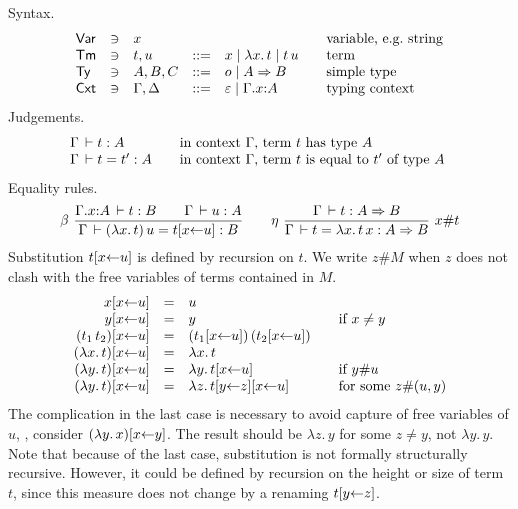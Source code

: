 \documentclass[a4paper,fleqn]{scrartcl}
\newcommand{\Var}{\mathsf{Var}}
\newcommand{\Ty}{\mathsf{Ty}}
\newcommand{\Tm}{\mathsf{Tm}}
\newcommand{\Cxt}{\mathsf{Cxt}}
\begin{document}
Syntax.
\[
\begin{array}{lllrl@{\qquad}l}
\Var & \ni & x & & & \mbox{variable, \eg string} \\
\Tm & \ni & t,u & ::= & x \mid \lambda x.\,t \mid t \, u & \mbox{term}
  \\
\Ty  & \ni & A,B,C & ::= & o \mid A \To B & \mbox{simple type} \\
\Cxt & \ni & \Gamma, \Delta & ::= & \varepsilon \mid \Gamma.x{:}A
  & \mbox{typing context}\\
\end{array}
\]
Judgements.
\[
\begin{array}{l@{\qquad}l}
  \Gamma \der t : A & \mbox{in context $\Gamma$, term $t$ has type $A$ } \\
  \Gamma \der t = t' : A & \mbox{in context $\Gamma$, term $t$ is equal to $t'$ of type $A$ } \\
\end{array}
\]
Equality rules.
\[
  \nru{\beta
    }{\Gamma.x{:}A \der t : B \qquad \Gamma \der u : A
    }{\Gamma \der (\lambda x.\,t)\,u = \subst u x t : B
    }
\qquad
  \nrux{\eta
   }{\Gamma \der t : A \To B
   }{\Gamma \der t = \lambda x.\,t\,x : A \To B
   }{x\#t}
\]
Substitution $\subst u x t$ is defined by recursion on $t$.
We write $z\#M$ when $z$ does not clash with the free variables of
terms contained in $M$.
\[
\begin{array}{rll@{\qquad}l}
  \subst u x x & = & u \\
  \subst u x y & = & y & \mbox{if } x \not= y \\
  \subst u x {(t_1\,t_2)} & = & (\subst u x {t_1})\, (\subst u x {t_2}) \\
  \subst u x {(\lambda x.\,t)} & = & \lambda x.\,t \\
  \subst u x {(\lambda y.\,t)} & = & \lambda y.\,{\subst u x t}
    & \mbox{if } y\#u \\
  \subst u x {(\lambda y.\,t)} & = & \lambda z.\,{\subst u x {\subst z y t}}
    & \mbox{for some } z\#(u,y) \\
\end{array}
\]
The complication in the last case is necessary to avoid capture of
free variables of $u$, \eg, consider $\substp y x {\lambda y.\,x}$.
The result should be $\lambda z.\,y$ for some $z \not= y$, not
$\lambda y.\,y$.
Note that because of the last case, substitution is not formally
structurally recursive.  However, it could be defined by recursion on
the height or size of term $t$, since this measure does not change by
a renaming $\subst z y t$.
\end{document}
